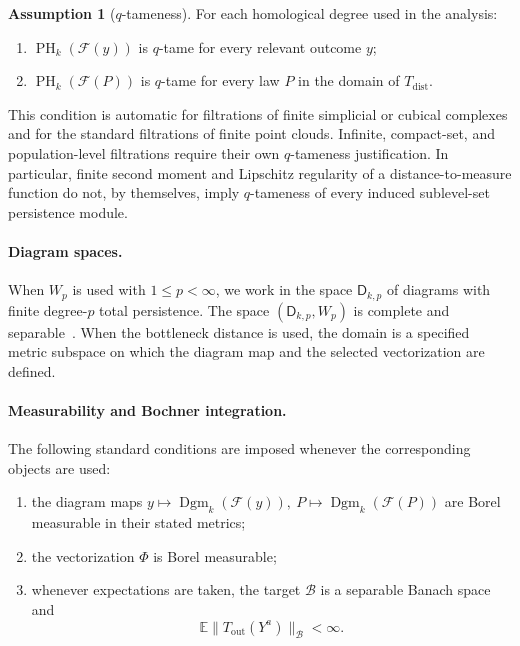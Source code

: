 \documentclass[11pt,a4paper]{article}
\theoremstyle{plain}
\theoremstyle{definition}
\newtheorem{assumption}[theorem]{Assumption}
\theoremstyle{remark}
\newcommand{\1}{\mathbbm{1}}
\begin{document}
\begin{assumption}[\(q\)-tameness]
\label{ass:q-tameness}
For each homological degree used in the analysis:

\begin{enumerate}
\item \(\operatorname{PH}_k(\mathcal F(y))\) is \(q\)-tame for every relevant outcome \(y\);

\item \(\operatorname{PH}_k(\mathcal F(P))\) is \(q\)-tame for every law \(P\) in the domain of \(T_{\mathrm{dist}}\).
\end{enumerate}
\end{assumption}

This condition is automatic for filtrations of finite simplicial or cubical complexes and for the standard filtrations of finite point clouds. Infinite, compact-set, and population-level filtrations require their own \(q\)-tameness justification. In particular, finite second
moment and Lipschitz regularity of a distance-to-measure function do not, by themselves, imply \(q\)-tameness of every induced sublevel-set persistence module.

\paragraph{Diagram spaces.}
When \(W_p\) is used with \(1\leq p<\infty\), we work in the space \(\mathsf D_{k,p}\) of diagrams with finite degree-\(p\) total persistence. The space \((\mathsf D_{k,p},W_p)\) is complete and separable~\citep{mileyko2011}. When the bottleneck distance is used, the domain is a specified metric subspace on which the diagram map and the selected vectorization are defined.

\paragraph{Measurability and Bochner integration.}
The following standard conditions are imposed whenever the
corresponding objects are used:

\begin{enumerate}
\item the diagram maps \( y\longmapsto\operatorname{Dgm}_k(\mathcal F(y)),
\ P\longmapsto\operatorname{Dgm}_k(\mathcal F(P))\) are Borel measurable in their stated metrics;

\item the vectorization \(\Phi\) is Borel measurable;

\item whenever expectations are taken, the target \(\mathcal B\) is a separable Banach space and
\[
\mathbb E\|T_{\mathrm{out}}(Y^a)\|_{\mathcal B}<\infty.
\]
\end{enumerate}
\end{document}
